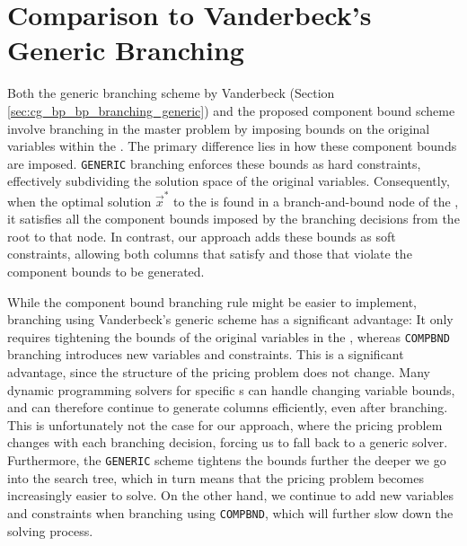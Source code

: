\section{Comparison to Vanderbeck's Generic Branching}\label{sec:cmpbnd_simdif}
Both the generic branching scheme by Vanderbeck (Section \ref{sec:cg_bp_bp_branching_generic}) and the proposed component bound scheme involve branching in the master problem by imposing bounds on the original variables within the \SP{}. The primary difference lies in how these component bounds are imposed. \texttt{GENERIC} branching enforces these bounds as hard constraints, effectively subdividing the solution space of the original variables. Consequently, when the optimal solution $\vec{x}^*$ to the \IP{} is found in a branch-and-bound node of the \RMP{}, it satisfies all the component bounds imposed by the branching decisions from the root to that node. In contrast, our approach adds these bounds as soft constraints, allowing both columns that satisfy and those that violate the component bounds to be generated.

While the component bound branching rule might be easier to implement, branching using Vanderbeck's generic scheme has a significant advantage: It only requires tightening the bounds of the original variables in the \SP{}, whereas \texttt{COMPBND} branching introduces new variables and constraints. This is a significant advantage, since the structure of the pricing problem does not change. Many dynamic programming solvers for specific \IP{}s can handle changing variable bounds, and can therefore continue to generate columns efficiently, even after branching. This is unfortunately not the case for our approach, where the pricing problem changes with each branching decision, forcing us to fall back to a generic \MIP{} solver. Furthermore, the \texttt{GENERIC} scheme tightens the bounds further the deeper we go into the search tree, which in turn means that the pricing problem becomes increasingly easier to solve. On the other hand, we continue to add new variables and constraints when branching using \texttt{COMPBND}, which will further slow down the solving process.
